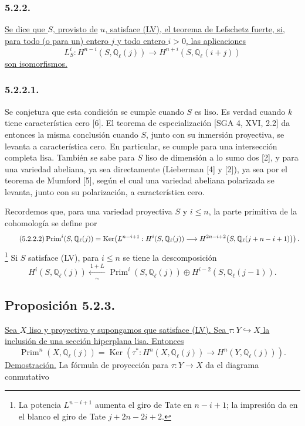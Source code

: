 \subsubsection*{5.2.2.}
\underline{Se dice que $S$, provisto de} $u$\underline{, satisface (LV), el teorema
de Lefschetz fuerte, si, para todo (o para un) entero $j$ y todo entero
$i>0$, las aplicaciones}
\[
L_S^i:H^{n-i}(S,\mathbb Q_\ell(j))
\longrightarrow H^{n+i}(S,\mathbb Q_\ell(i+j))
\]
\underline{son isomorfismos.}

\pageoriginale

\subsubsection*{5.2.2.1.}
Se conjetura que esta condición se cumple cuando $S$ es liso. Es
verdad cuando $k$ tiene característica cero [6]. El teorema de
especialización [SGA 4, XVI, 2.2] da entonces la misma conclusión
cuando $S$, junto con su inmersión proyectiva, se levanta a
característica cero. En particular, se cumple para una intersección
completa lisa. También se sabe para $S$ liso de dimensión a lo sumo
dos [2], y para una variedad abeliana, ya sea directamente
(Lieberman [4] y [2]), ya sea por el teorema de Mumford [5], según el
cual una variedad abeliana polarizada se levanta, junto con su
polarización, a característica cero.

Recordemos que, para una variedad proyectiva $S$ y $i\leq n$, la parte
primitiva de la cohomología se define por
{\footnotesize\begin{equation}\tag{5.2.2.2}
\operatorname{Prim}^i(S,\mathbb Q_\ell(j))
=\operatorname{Ker}\!\left(
L^{n-i+1}:H^i(S,\mathbb Q_\ell(j))
\longrightarrow
H^{2n-i+2}\bigl(S,\mathbb Q_\ell(
  \sisi{j+2n-2i+2}{j+n-i+1})\bigr)
\right).
\end{equation}}
\footnote{La potencia $L^{n-i+1}$ aumenta el giro de Tate en $n-i+1$; la
impresión da en el blanco el giro de Tate $j+2n-2i+2$.}
Si $S$ satisface (LV), para $i\leq n$ se tiene la descomposición
\begin{equation}\tag{5.2.2.3}
H^i(S,\mathbb Q_\ell(j))
\xleftarrow[\sim]{\ 1+L\ }
\operatorname{Prim}^i(S,\mathbb Q_\ell(j))
\oplus H^{i-2}(S,\mathbb Q_\ell(j-1)).
\end{equation}

\subsection*{Proposición 5.2.3.}
\underline{Sea $X$ liso y proyectivo y supongamos que satisface (LV).
Sea $\tau:Y\hookrightarrow X$ la inclusión de una sección hiperplana
lisa. Entonces}
\begin{equation}\tag{5.2.3.1}
\operatorname{Prim}^n(X,\mathbb Q_\ell(j))
=\operatorname{Ker}\!\left(
\tau^*:H^n(X,\mathbb Q_\ell(j))
\longrightarrow H^n(Y,\mathbb Q_\ell(j))
\right).
\end{equation}
\noindent\underline{Demostración.}
La fórmula de proyección para $\tau:Y\to X$ da el diagrama conmutativo

